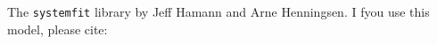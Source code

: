 The \texttt{systemfit} library by Jeff Hamann and Arne Henningsen. I fyou use this model, please cite:
\begin{verse}
\end{verse}
